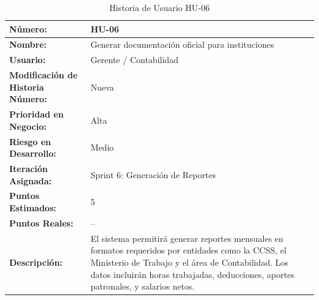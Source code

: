 \begin{table}[h]
	\centering
	\caption{Historia de Usuario HU-06}
	\begin{tabular}{|p{5cm}|p{9cm}|}
		\hline
		\textbf{Número:}                          & HU-06                                                                                                                               \\ \hline
		\textbf{Nombre:}                          & Generar documentación oficial para instituciones                                                                                    \\ \hline
		\textbf{Usuario:}                         & Gerente / Contabilidad                                                                                                              \\ \hline
		\textbf{Modificación de Historia Número:} & Nueva                                                                                                                               \\ \hline
		\textbf{Prioridad en Negocio:}            & Alta                                                                                                                                \\ \hline
		\textbf{Riesgo en Desarrollo:}            & Medio                                                                                                                               \\ \hline
		\textbf{Iteración Asignada:}              & Sprint 6: Generación de Reportes                                                                                                    \\ \hline
		\textbf{Puntos Estimados:}                & 5                                                                                                                                   \\ \hline
		\textbf{Puntos Reales:}                   & --                                                                                                                                  \\ \hline
		\textbf{Descripción:}                     &
		El sistema permitirá generar reportes mensuales en formatos requeridos por entidades como la CCSS, el Ministerio de Trabajo y el área de Contabilidad. Los datos incluirán horas trabajadas, deducciones, aportes patronales, y salarios netos.


\end{tabular}
\end{table}
